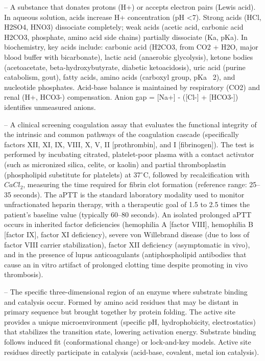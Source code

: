 -- A substance that donates protons (H+) or accepts electron pairs (Lewis acid). In aqueous solution, acids increase H+ concentration (pH <7). Strong acids (HCl, H2SO4, HNO3) dissociate completely; weak acids (acetic acid, carbonic acid H2CO3, phosphate, amino acid side chains) partially dissociate (Ka, pKa). In biochemistry, key acids include: carbonic acid (H2CO3, from CO2 + H2O, major blood buffer with bicarbonate), lactic acid (anaerobic glycolysis), ketone bodies (acetoacetate, beta-hydroxybutyrate, diabetic ketoacidosis), uric acid (purine catabolism, gout), fatty acids, amino acids (carboxyl group, pKa ~2), and nucleotide phosphates. Acid-base balance is maintained by respiratory (CO2) and renal (H+, HCO3-) compensation. Anion gap = [Na+] - ([Cl-] + [HCO3-]) identifies unmeasured anions.

-- A clinical screening coagulation assay that evaluates the functional integrity of the intrinsic and common pathways of the coagulation cascade (specifically factors XII, XI, IX, VIII, X, V, II [prothrombin], and I [fibrinogen]). The test is performed by incubating citrated, platelet-poor plasma with a contact activator (such as micronized silica, celite, or kaolin) and partial thromboplastin (phospholipid substitute for platelets) at 37$^\circ$C, followed by recalcification with $CaCl_2$, measuring the time required for fibrin clot formation (reference range: 25--35 seconds). The aPTT is the standard laboratory modality used to monitor unfractionated heparin therapy, with a therapeutic goal of 1.5 to 2.5 times the patient's baseline value (typically 60--80 seconds). An isolated prolonged aPTT occurs in inherited factor deficiencies (hemophilia A [factor VIII], hemophilia B [factor IX], factor XI deficiency), severe von Willebrand disease (due to loss of factor VIII carrier stabilization), factor XII deficiency (asymptomatic in vivo), and in the presence of lupus anticoagulants (antiphospholipid antibodies that cause an in vitro artifact of prolonged clotting time despite promoting in vivo thrombosis).

-- The specific three-dimensional region of an enzyme where substrate binding and catalysis occur. Formed by amino acid residues that may be distant in primary sequence but brought together by protein folding. The active site provides a unique microenvironment (specific pH, hydrophobicity, electrostatics) that stabilizes the transition state, lowering activation energy. Substrate binding follows induced fit (conformational change) or lock-and-key models. Active site residues directly participate in catalysis (acid-base, covalent, metal ion catalysis).

